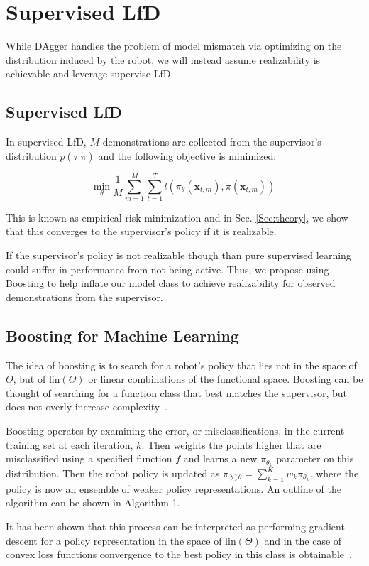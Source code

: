 \documentclass[10pt, conference]{ieeeconf}      %
\newcommand{\bx}{\mathbf{x}}
\begin{document}
\section{Supervised LfD}
While DAgger handles the problem of model mismatch via optimizing on the distribution induced by the robot, we will instead assume realizability is achievable and leverage supervise LfD.  

\subsection{Supervised LfD}
In supervised LfD, $M$ demonstrations are collected from the supervisor's distribution $p(\tau|\tilde{\pi})$ and the following objective is minimized: 

$$\underset{\theta}{\mbox{min}} \: \frac{1}{M} \sum^M_{m=1} \sum^T_{t=1} l(\pi_{\theta}(\bx_{t,m}), \tilde{\pi}(\bx_{t,m}))$$

This is known as empirical risk minimization and in Sec. \ref{Sec:theory}, we show that this converges to the supervisor's policy if it is realizable. 

If the supervisor's policy is not realizable though than pure supervised learning could suffer in performance from not being active. Thus, we propose using Boosting to help inflate our model class to achieve realizability for observed demonstrations from the supervisor. 

\subsection{Boosting for Machine Learning}
The idea of boosting is to search for a robot's policy that lies not in the space of $\Theta$, but of $\mbox{lin}(\Theta)$ or linear combinations of the functional space. Boosting can be thought of searching for a function class that best matches the supervisor, but does not overly increase complexity~\cite{buhlmann2003boosting}.

Boosting operates by examining the error, or misclassifications, in the current training set at each iteration, $k$. Then weights the points higher that are misclassified using a specified function $f$ and learns a new $\pi_{\theta_k}$ parameter on this distribution.  Then the robot policy is updated as $\pi_{\sum \theta} = \sum^K_{k=1} w_k \pi_{\theta_k}$, where the policy is now an ensemble of weaker policy representations. An outline of the algorithm can be shown in Algorithm 1.

It has been shown that this process can be interpreted as performing gradient descent for a policy representation in the space of $\mbox{lin}(\Theta)$ and in the case of convex loss functions convergence to the best policy in this class is obtainable~\cite{mason1999boosting}.
\end{document}
